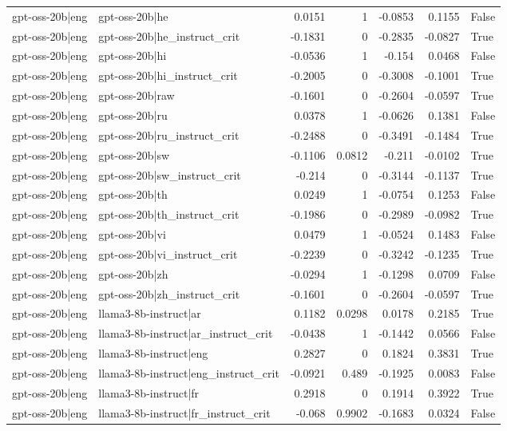 \begin{table}
\begin{tabular}{l l r r r r l}
gpt-oss-20b|eng & gpt-oss-20b|he & 0.0151 & 1 & -0.0853 & 0.1155 & False \\
gpt-oss-20b|eng & gpt-oss-20b|he_instruct_crit & -0.1831 & 0 & -0.2835 & -0.0827 & True \\
gpt-oss-20b|eng & gpt-oss-20b|hi & -0.0536 & 1 & -0.154 & 0.0468 & False \\
gpt-oss-20b|eng & gpt-oss-20b|hi_instruct_crit & -0.2005 & 0 & -0.3008 & -0.1001 & True \\
gpt-oss-20b|eng & gpt-oss-20b|raw & -0.1601 & 0 & -0.2604 & -0.0597 & True \\
gpt-oss-20b|eng & gpt-oss-20b|ru & 0.0378 & 1 & -0.0626 & 0.1381 & False \\
gpt-oss-20b|eng & gpt-oss-20b|ru_instruct_crit & -0.2488 & 0 & -0.3491 & -0.1484 & True \\
gpt-oss-20b|eng & gpt-oss-20b|sw & -0.1106 & 0.0812 & -0.211 & -0.0102 & True \\
gpt-oss-20b|eng & gpt-oss-20b|sw_instruct_crit & -0.214 & 0 & -0.3144 & -0.1137 & True \\
gpt-oss-20b|eng & gpt-oss-20b|th & 0.0249 & 1 & -0.0754 & 0.1253 & False \\
gpt-oss-20b|eng & gpt-oss-20b|th_instruct_crit & -0.1986 & 0 & -0.2989 & -0.0982 & True \\
gpt-oss-20b|eng & gpt-oss-20b|vi & 0.0479 & 1 & -0.0524 & 0.1483 & False \\
gpt-oss-20b|eng & gpt-oss-20b|vi_instruct_crit & -0.2239 & 0 & -0.3242 & -0.1235 & True \\
gpt-oss-20b|eng & gpt-oss-20b|zh & -0.0294 & 1 & -0.1298 & 0.0709 & False \\
gpt-oss-20b|eng & gpt-oss-20b|zh_instruct_crit & -0.1601 & 0 & -0.2604 & -0.0597 & True \\
gpt-oss-20b|eng & llama3-8b-instruct|ar & 0.1182 & 0.0298 & 0.0178 & 0.2185 & True \\
gpt-oss-20b|eng & llama3-8b-instruct|ar_instruct_crit & -0.0438 & 1 & -0.1442 & 0.0566 & False \\
gpt-oss-20b|eng & llama3-8b-instruct|eng & 0.2827 & 0 & 0.1824 & 0.3831 & True \\
gpt-oss-20b|eng & llama3-8b-instruct|eng_instruct_crit & -0.0921 & 0.489 & -0.1925 & 0.0083 & False \\
gpt-oss-20b|eng & llama3-8b-instruct|fr & 0.2918 & 0 & 0.1914 & 0.3922 & True \\
gpt-oss-20b|eng & llama3-8b-instruct|fr_instruct_crit & -0.068 & 0.9902 & -0.1683 & 0.0324 & False \\

\end{tabular}
\end{table}
